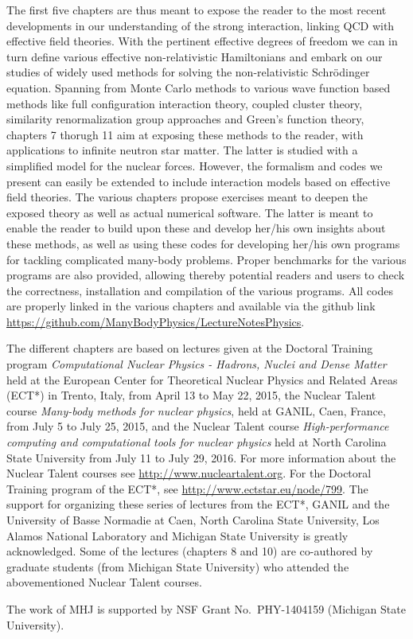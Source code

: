 The first five chapters are thus meant to
expose the reader to the most recent developments in our understanding
of the strong interaction, linking QCD with effective field
theories. With the pertinent effective degrees of freedom we can in
turn define various effective non-relativistic Hamiltonians and embark
on our studies of widely used methods for solving the non-relativistic
Schr\"odinger equation. Spanning from Monte Carlo methods to various
wave function based methods like full configuration interaction
theory, coupled cluster theory, similarity renormalization group
approaches and Green's function theory, chapters 7 thorugh 11 aim at
exposing these methods to the reader, with applications to infinite neutron star
matter. The latter is studied with a simplified model for the nuclear
forces. However, the formalism and codes we present can easily be
extended to include interaction models based on effective field
theories.  The various chapters propose exercises meant to deepen the
exposed theory as well as actual numerical software.  The latter is
meant to enable the reader to build upon these and develop her/his own
insights about these methods, as well as using these codes for
developing her/his own programs for tackling complicated many-body
problems.  Proper benchmarks for the various programs are also
provided, allowing thereby potential readers and users to check the
correctness, installation and compilation of the various programs. All
codes are properly linked in the various chapters and available via
the github
link \url{https://github.com/ManyBodyPhysics/LectureNotesPhysics}.


\begin{acknowledgement}
The different chapters are based on lectures given at the Doctoral Training program {\em Computational Nuclear Physics - Hadrons, Nuclei and Dense Matter} held at  the European Center for Theoretical Nuclear Physics
and Related Areas (ECT*) in Trento, Italy, from April 13 to May 22, 2015, the Nuclear Talent course {\em Many-body methods for nuclear physics}, held at GANIL, Caen, France, from July 5 to July 25,  2015, and the Nuclear Talent course {\em High-performance computing and computational tools for nuclear physics} held at North Carolina State University from July 11 to July 29, 2016. For more information about the Nuclear Talent courses see \url{http://www.nucleartalent.org}. For the Doctoral Training program of the ECT*, see \url{http://www.ectstar.eu/node/799}.
The support for organizing these series of lectures from the ECT*, GANIL and the University of Basse Normadie at Caen, North Carolina State University, Los Alamos National Laboratory and Michigan State University is greatly acknowledged.   Some of the lectures (chapters 8 and 10) are co-authored by graduate students (from Michigan State University) who  attended the abovementioned Nuclear Talent courses.


The work of MHJ is supported by NSF Grant No.~PHY-1404159 (Michigan State University). 
\end{acknowledgement}

